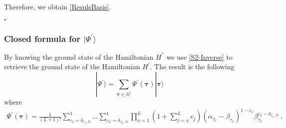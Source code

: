 \documentclass[10pt]{article}
\numberwithin{equation}{section}
\numberwithin{equation}{subsection}
\newcommand{\dt}{\;.}
\begin{document}
Therefore, we obtain \eqref{ResulsBasis}.
\begin{flushright}
	$\square$
\end{flushright} 
\subsubsection{Closed formula for $|\Psi^{'}\rangle$}\label{subsectionSSdual}
By knowing the ground state  of the Hamiltonian $H^{''}$ we use \eqref{S2-Inverse} to retrieve the ground state of the Hamiltonian $H^{'}$. The result is the following 
\begin{equation}\label{ABS-vect}
    |\Psi^{'}\rangle =\sum_{\bm{\tau}\in \Omega^{'}}\Psi^{'}(\bm{\tau})|\bm{\tau}\rangle 
\end{equation}
where  
\begin{equation}\label{ABS}
		\begin{split}
			\Psi^{'}(\bm{\tau})=\frac{1}{(L+1)!}\sum_{c_{1}=\delta_{\tau_{1},N}}^{1}\ldots\sum_{c_{L}=\delta_{\tau_{L},N}}^{1}\prod_{x=1}^{L}\left(1+\sum_{j=x}^{L}c_{j}\right)(\alpha_{\tau_{x}}-\beta_{\tau_{x}})^{1-c_{x}}\beta_{\tau_{x}}^{c_{x}-\delta_{\tau_{x},N}}\dt
		\end{split}
	\end{equation} 
\end{document}
